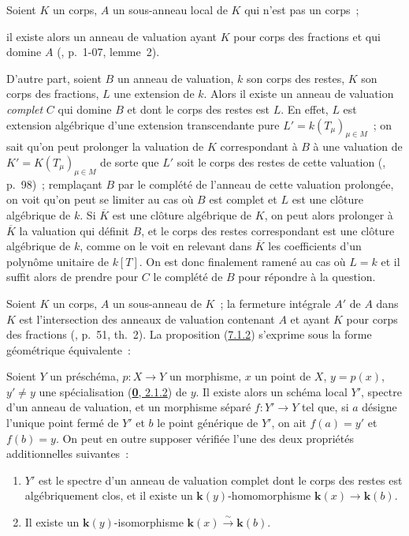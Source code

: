 \begin{env}[7.1.2]
\label{II.7.1.2-fr}
Soient $K$ un corps, $A$ un sous-anneau local de $K$ qui n'est pas un corps~;


il existe alors un anneau de valuation ayant $K$ pour corps des fractions et
qui domine $A$ (\cite{I-1}, p.~1-07, lemme~2).

D'autre part, soient $B$ un anneau de valuation, $k$ son corps des restes,
$K$ son corps des fractions, $L$ une extension de $k$. Alors il existe un
anneau de valuation \emph{complet} $C$ qui domine $B$ et dont le corps des
restes est $L$. En effet, $L$ est extension algébrique d'une extension
transcendante pure $L'=k(T_\mu)_{\mu\in M}$~; on sait qu'on peut prolonger la
valuation de $K$ correspondant à $B$ à une valuation de
$K'=K(T_\mu)_{\mu\in M}$ de sorte que $L'$ soit le corps des restes de cette
valuation (\cite{II-24}, p.~98)~; remplaçant $B$ par le complété de l'anneau
de cette valuation prolongée, on voit qu'on peut se limiter au cas où $B$ est
complet et $L$ est une clôture algébrique de $k$. Si $\overline{K}$ est une
clôture algébrique de $K$, on peut alors prolonger à $\overline{K}$ la
valuation qui définit $B$, et le corps des restes correspondant est une
clôture algébrique de $k$, comme on le voit en relevant dans $\overline{K}$
les coefficients d'un polynôme unitaire de $k[T]$. On est donc finalement
ramené au cas où $L=k$ et il suffit alors de prendre pour $C$ le complété de
$B$ pour répondre à la question.
\end{env}

\begin{env}[7.1.3]
\label{II.7.1.3-fr}
Soient $K$ un corps, $A$ un sous-anneau de $K$~; la fermeture intégrale $A'$
de $A$ dans $K$ est l'intersection des anneaux de valuation contenant $A$ et
ayant $K$ pour corps des fractions
(\cite{I-11}, p.~51, th.~2). La proposition
(\hyperref[II.7.1.2-fr]{7.1.2}) s'exprime sous la forme géométrique
équivalente~:
\end{env}

\begin{proposition}[7.1.4]
\label{II.7.1.4-fr}
Soient $Y$ un préschéma, $p:X\to Y$ un morphisme, $x$ un point de $X$,
$y=p(x)$, $y'\neq y$ une spécialisation
\textup{(\hyperref[0.2.1.2-fr]{\textbf{0}, 2.1.2})} de $y$. Il existe alors un schéma local
$Y'$, spectre d'un anneau de valuation, et un morphisme séparé $f:Y'\to Y$
tel que, si $a$ désigne l'unique point fermé de $Y'$ et $b$ le point
générique de $Y'$, on ait $f(a)=y'$ et $f(b)=y$. On peut en outre supposer
vérifiée l'une des deux propriétés additionnelles suivantes~:
\begin{enumerate}
\item[\rm{(i)}] $Y'$ est le spectre d'un anneau de valuation complet
dont le corps des restes est algébriquement clos, et il existe un
$\boldsymbol{k}(y)$-homomorphisme $\boldsymbol{k}(x)\to \boldsymbol{k}(b)$.
\item[\rm{(ii)}] Il existe un $\boldsymbol{k}(y)$-isomorphisme
$\boldsymbol{k}(x)\xrightarrow{\sim}\boldsymbol{k}(b)$.
\end{enumerate}
\end{proposition}

